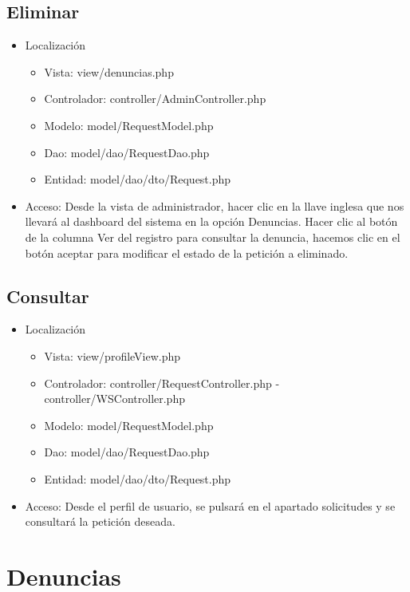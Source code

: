 \subsection{Eliminar}
\begin{itemize}
\item Localizaci\'{o}n
\begin{itemize}
\item Vista: view/denuncias.php
\item Controlador: controller/AdminController.php
\item Modelo: model/RequestModel.php
\item Dao: model/dao/RequestDao.php
\item Entidad: model/dao/dto/Request.php
\end{itemize}
\item Acceso: Desde la vista de administrador, hacer clic en la llave inglesa que nos llevar\'{a} al dashboard del sistema en la opci\'{o}n Denuncias. Hacer clic al bot\'{o}n de la columna Ver del registro para consultar la denuncia, hacemos clic en el bot\'{o}n aceptar para modificar el estado de la petici\'{o}n a eliminado.
\end{itemize}
\subsection{Consultar}
\begin{itemize}
\item Localizaci\'{o}n
\begin{itemize}
\item Vista: view/profileView.php
\item Controlador: controller/RequestController.php - controller/WSController.php
\item Modelo: model/RequestModel.php
\item Dao: model/dao/RequestDao.php
\item Entidad: model/dao/dto/Request.php
\end{itemize}
\item Acceso: Desde el perfil de usuario, se pulsar\'{a} en el apartado solicitudes y se consultar\'{a} la petici\'{o}n deseada.
\end{itemize}

\section{Denuncias}

